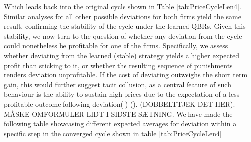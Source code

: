 \documentclass{article}
\begin{document}
Which leads back into the original cycle shown in Table \ref{tab:PriceCycleLen4}. Similar analyses for all other possible deviations for both firms yield the same result, confirming the stability of the cycle under the learned QBRs.
\newline
Given this stability, we now turn to the question of whether any deviation from the cycle could nonetheless be profitable for one of the firms. Specifically, we assess whether deviating from the learned (stable) strategy yields a higher expected profit than sticking to it, or whether the resulting sequence of punishments renders deviation unprofitable. If the cost of deviating outweighs the short term gain, this would further suggest tacit collusion, as a central feature of such behaviour is the ability to sustain high prices due to the expectation of a less profitable outcome following deviation( \cite{Klein2021}) (\cite{Calvano}). (DOBBELTTJEK DET HER). MÅSKE OMFORMULER LIDT I SIDSTE SÆTNING.
\newline
We have made the following table showcasing different expected averages for deviation within a specific step in the converged cycle shown in table \ref{tab:PriceCycleLen4}
\end{document}
